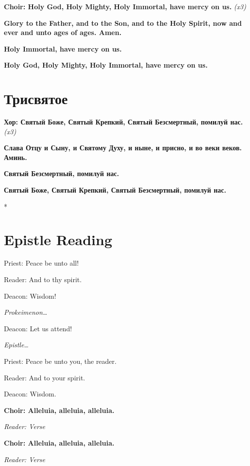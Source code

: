 \documentclass[12pt,a4paper,titlepage]{report}
\begin{document}
\begin{paracol}[1]{2}
	\textbf{Choir: Holy God, Holy Mighty, Holy Immortal, have mercy on us. } \textit{(x3)}
	
	\textbf{Glory to the Father, and to the Son, and to the Holy Spirit, now and ever and unto ages of ages. Amen.}
	
	\textbf{Holy Immortal, have mercy on us.}
	
	\textbf{Holy God, Holy Mighty, Holy Immortal, have mercy on us.}
	
	\switchcolumn[1]
	
	\section*{Трисвятое}
	\textbf{Хор: Святый Боже, Святый Крепкий, Святый Безсмертный, помилуй нас. } \foreignlanguage{english}{\textit{(x3)}}
	
	\textbf{Слава Отцу и Сыну, и Святому Духу, и ныне, и присно, и во веки веков. Аминь.}
	
	\textbf{Святый Безсмертный, помилуй нас.}
	
	\textbf{Святый Боже, Святый Крепкий, Святый Безсмертный, помилуй нас.}
	
	\switchcolumn[0]*
	
	\section*{Epistle Reading}
	
	Priest: Peace be unto all!
	
	Reader: And to thy spirit.
	
	Deacon: Wisdom!
	
	\medskip
	\indent \textit{Prokeimenon\ldots}
	\medskip
	
	Deacon: Let us attend!
	
	\medskip
	\indent \textit{Epistle\ldots}
	\medskip
	
	Priest: Peace be unto you, the reader.
	
	Reader: And to your spirit.
	
	Deacon: Wisdom.
	
	\textbf{Choir: Alleluia, alleluia, alleluia.}
	
	\textit{Reader: Verse}
	
	\textbf{Choir: Alleluia, alleluia, alleluia.}
	
	\textit{Reader: Verse}
	

\end{paracol}
\end{document}
